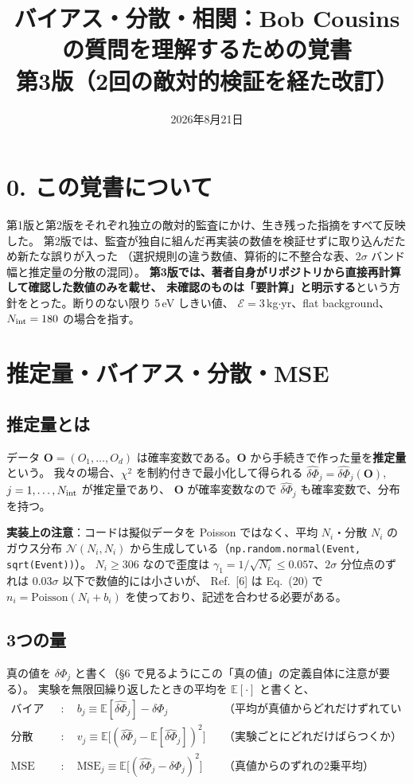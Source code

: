 \documentclass[11pt,a4paper]{ltjsarticle}
\title{\vspace{-14mm}バイアス・分散・相関：Bob Cousins の質問を理解するための覚書\\
\large 第3版（2回の敵対的検証を経た改訂）\vspace{-3mm}}
\author{}\date{2026年8月21日}
\newcommand{\dP}{\delta\Phi}
\newcommand{\dPh}{\widehat{\delta\Phi}}
\newcommand{\E}{\mathbb{E}}
\newcommand{\Nint}{N_{\rm int}}
\begin{document}
\maketitle\vspace{-10mm}

\section*{0. この覚書について}
第1版と第2版をそれぞれ独立の敵対的監査にかけ、生き残った指摘をすべて反映した。
第2版では、監査が独自に組んだ再実装の数値を検証せずに取り込んだため新たな誤りが入った
（選択規則の違う数値、算術的に不整合な表、$2\sigma$ バンド幅と推定量の分散の混同）。
\textbf{第3版では、著者自身がリポジトリから直接再計算して確認した数値のみを載せ、
未確認のものは「要計算」と明示する}という方針をとった。断りのない限り 5\,eV しきい値、
$\mathcal{E}=3$\,kg$\cdot$yr、flat background、$\Nint=180$ の場合を指す。

\section{推定量・バイアス・分散・MSE}

\subsection*{推定量とは}
データ $\bm O=(O_1,\dots,O_d)$ は確率変数である。$\bm O$ から手続きで作った量を\textbf{推定量}という。
我々の場合、$\chi^2$ を制約付きで最小化して得られる $\dPh_j=\dPh_j(\bm O)$, $j=1,\dots,\Nint$ が推定量であり、
$\bm O$ が確率変数なので $\dPh_j$ も確率変数で、分布を持つ。

\textbf{実装上の注意}：コードは擬似データを Poisson ではなく、平均 $N_i$・分散 $N_i$ のガウス分布
$\mathcal N(N_i,N_i)$ から生成している（\texttt{np.random.normal(Event,\,sqrt(Event))}）。
$N_i\ge306$ なので歪度は $\gamma_1=1/\sqrt{N_i}\le0.057$、$2\sigma$ 分位点のずれは $0.03\sigma$ 以下で数値的には小さいが、
Ref.~[6] は Eq.~(20) で $n_i=\mathrm{Poisson}(N_i+b_i)$ を使っており、記述を合わせる必要がある。

\subsection*{3つの量}
真の値を $\dP_j$ と書く（\S6 で見るようにこの「真の値」の定義自体に注意が要る）。
実験を無限回繰り返したときの平均を $\E[\cdot]$ と書くと、
\begin{align}
\text{バイアス}&:\quad b_j \equiv \E[\dPh_j]-\dP_j
&&\text{（平均が真値からどれだけずれているか）}\\
\text{分散}&:\quad v_j \equiv \E\big[(\dPh_j-\E[\dPh_j])^2\big]
&&\text{（実験ごとにどれだけばらつくか）}\\
\text{MSE}&:\quad \mathrm{MSE}_j \equiv \E\big[(\dPh_j-\dP_j)^2\big]
&&\text{（真値からのずれの2乗平均）}
\end{align}
\end{document}
